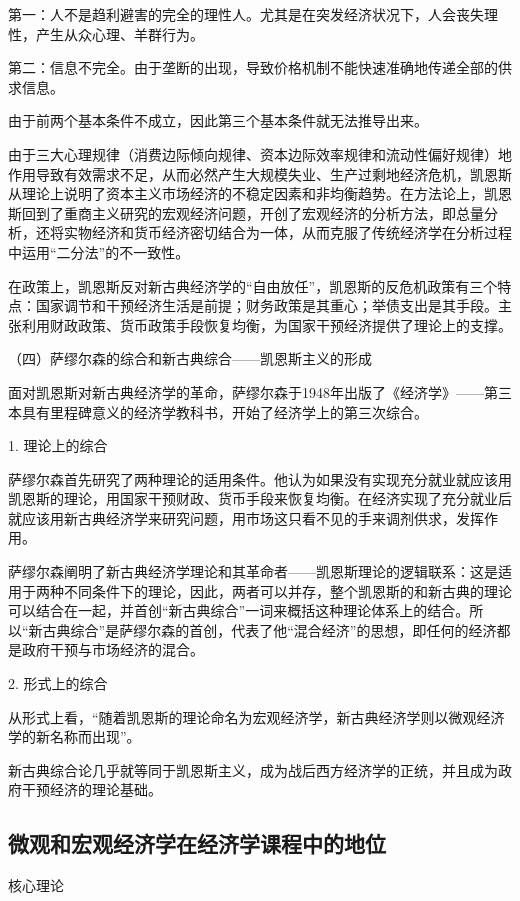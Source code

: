 \documentclass{article}
\begin{document}
第一：人不是趋利避害的完全的理性人。尤其是在突发经济状况下，人会丧失理性，产生从众心理、羊群行为。

第二：信息不完全。由于垄断的出现，导致价格机制不能快速准确地传递全部的供求信息。

由于前两个基本条件不成立，因此第三个基本条件就无法推导出来。

由于三大心理规律（消费边际倾向规律、资本边际效率规律和流动性偏好规律）地作用导致有效需求不足，从而必然产生大规模失业、生产过剩地经济危机，凯恩斯从理论上说明了资本主义市场经济的不稳定因素和非均衡趋势。在方法论上，凯恩斯回到了重商主义研究的宏观经济问题，开创了宏观经济的分析方法，即总量分析，还将实物经济和货币经济密切结合为一体，从而克服了传统经济学在分析过程中运用“二分法”的不一致性。

在政策上，凯恩斯反对新古典经济学的“自由放任”，凯恩斯的反危机政策有三个特点：国家调节和干预经济生活是前提；财务政策是其重心；举债支出是其手段。主张利用财政政策、货币政策手段恢复均衡，为国家干预经济提供了理论上的支撑。

\hspace*{\fill}

（四）萨缪尔森的综合和新古典综合——凯恩斯主义的形成

面对凯恩斯对新古典经济学的革命，萨缪尔森于1948年出版了《经济学》——第三本具有里程碑意义的经济学教科书，开始了经济学上的第三次综合。

1. 理论上的综合

萨缪尔森首先研究了两种理论的适用条件。他认为如果没有实现充分就业就应该用凯恩斯的理论，用国家干预财政、货币手段来恢复均衡。在经济实现了充分就业后就应该用新古典经济学来研究问题，用市场这只看不见的手来调剂供求，发挥作用。

萨缪尔森阐明了新古典经济学理论和其革命者——凯恩斯理论的逻辑联系：这是适用于两种不同条件下的理论，因此，两者可以并存，整个凯恩斯的和新古典的理论可以结合在一起，并首创“新古典综合”一词来概括这种理论体系上的结合。所以“新古典综合”是萨缪尔森的首创，代表了他“混合经济”的思想，即任何的经济都是政府干预与市场经济的混合。

2. 形式上的综合

从形式上看，“随着凯恩斯的理论命名为宏观经济学，新古典经济学则以微观经济学的新名称而出现”。

新古典综合论几乎就等同于凯恩斯主义，成为战后西方经济学的正统，并且成为政府干预经济的理论基础。

\subsection{微观和宏观经济学在经济学课程中的地位}
核心理论
\end{document}
